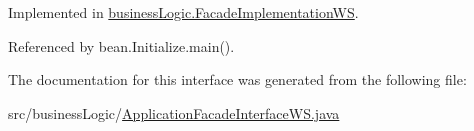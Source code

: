 Implemented in \mbox{\hyperlink{classbusinessLogic_1_1FacadeImplementationWS_a94a4600e9c80794676f06c888e9e682d}{business\+Logic.\+Facade\+Implementation\+WS}}.



Referenced by bean.\+Initialize.\+main().



The documentation for this interface was generated from the following file\+:\begin{DoxyCompactItemize}
\item 
src/business\+Logic/\mbox{\hyperlink{ApplicationFacadeInterfaceWS_8java}{Application\+Facade\+Interface\+W\+S.\+java}}\end{DoxyCompactItemize}
